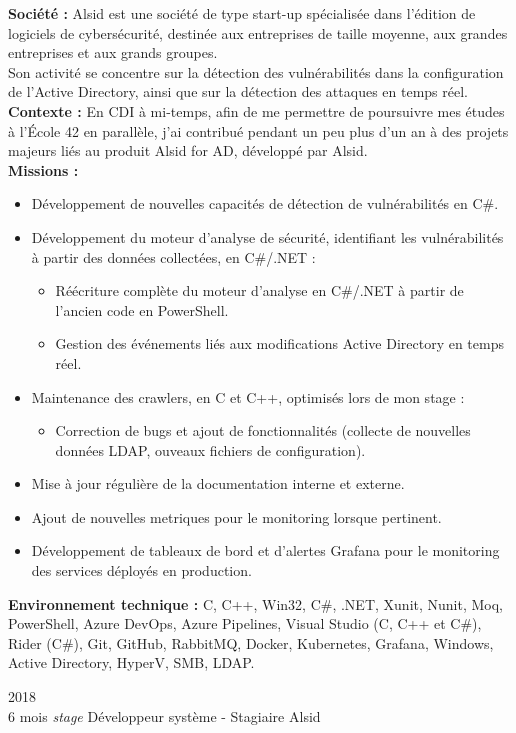 \documentclass[8pt]{developercv} %
\begin{document}
\textbf{Société :} Alsid est une société de type start-up spécialisée dans l'édition de logiciels de cybersécurité, destinée aux entreprises de taille moyenne, aux grandes entreprises et aux grands groupes.\\
Son activité se concentre sur la détection des vulnérabilités dans la configuration de l'Active Directory, ainsi que sur la détection des attaques en temps réel.\\

\textbf{Contexte :} En CDI à mi-temps, afin de me permettre de poursuivre mes études à l'École 42 en parallèle, j'ai contribué pendant un peu plus d'un an à des projets majeurs liés au produit Alsid for AD, développé par Alsid.\\

\textbf{Missions :}
\begin{itemize}
    \item Développement de nouvelles capacités de détection de vulnérabilités en C\#.
    \item Développement du moteur d'analyse de sécurité, identifiant les vulnérabilités à partir des données collectées, en C\#/.NET :
        \begin{itemize}
            \item Réécriture complète du moteur d'analyse en C\#/.NET à partir de l'ancien code en PowerShell.
            \item Gestion des événements liés aux modifications Active Directory en temps réel.
        \end{itemize}
    \item Maintenance des crawlers, en C et C++, optimisés lors de mon stage :
        \begin{itemize}
            \item Correction de bugs et ajout de fonctionnalités (collecte de nouvelles données LDAP, ouveaux fichiers de configuration).
        \end{itemize}
    \item Mise à jour régulière de la documentation interne et externe.
    \item Ajout de nouvelles metriques pour le monitoring lorsque pertinent.
    \item Développement de tableaux de bord et d'alertes Grafana pour le monitoring des services déployés en production.
\end{itemize}
\vspace{\baselineskip}
\textbf{Environnement technique :} C, C++, Win32, C\#, .NET, Xunit, Nunit, Moq, PowerShell, Azure DevOps, Azure Pipelines, Visual Studio (C, C++ et C\#), Rider (C\#), Git, GitHub, RabbitMQ, Docker, Kubernetes, Grafana, Windows, Active Directory, HyperV, SMB, LDAP.\\
\vspace{\baselineskip}
\begin{entrylisthrules}
    \entry
    {2018\\\footnotesize{6 mois \emph{stage}}}
    {Développeur système  - Stagiaire}
    {Alsid}
    {}
\end{entrylisthrules}
\end{document}
